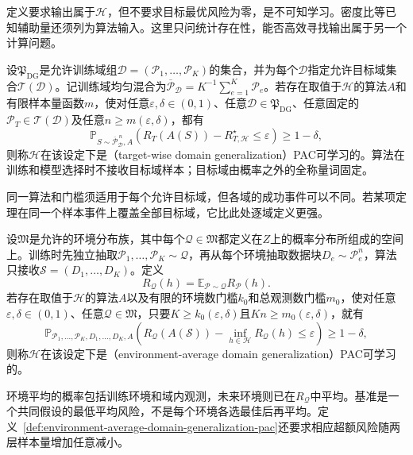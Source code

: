 定义要求输出属于$\mathcal H$，但不要求目标最优风险为零，是不可知学习。密度比等已知辅助量还须列为算法输入。这里只问统计存在性，能否高效寻找输出属于另一个计算问题。

\begin{definition}[逐目标域领域泛化PAC可学习性]
\label{def:targetwise-domain-generalization-pac}
设$\mathfrak P_{\mathrm{DG}}$是允许训练域组$\mathcal D=(\mathcal P_1,\ldots,\mathcal P_K)$的集合，并为每个$\mathcal D$指定允许目标域集合$\mathcal T(\mathcal D)$。记训练域均匀混合为$\overline{\mathcal P}_{\mathcal D}=K^{-1}\sum_{e=1}^K\mathcal P_e$。若存在取值于$\mathcal H$的算法$A$和有限样本量函数$m$，使对任意$\varepsilon,\delta\in(0,1)$、任意$\mathcal D\in\mathfrak P_{\mathrm{DG}}$、任意固定的$\mathcal P_T\in\mathcal T(\mathcal D)$及任意$n\geq m(\varepsilon,\delta)$，都有
\[
 \mathbb P_{S\sim\overline{\mathcal P}_{\mathcal D}^{\,n},A}\!\left(
 R_T(A(S))-R_{T,\mathcal H}^{\star}\leq\varepsilon
 \right)\geq1-\delta,
\]
则称$\mathcal H$在该设定下是（target-wise domain generalization）PAC可学习的。算法在训练和模型选择时不接收目标域样本；目标域由概率之外的全称量词固定。
\end{definition}

同一算法和门槛须适用于每个允许目标域，但各域的成功事件可以不同。若某项定理在同一个样本事件上覆盖全部目标域，它比此处逐域定义更强。

\begin{definition}[环境平均领域泛化PAC可学习性]
\label{def:environment-average-domain-generalization-pac}
设$\mathfrak M$是允许的环境分布族，其中每个$\mathcal Q\in\mathfrak M$都定义在$Z$上的概率分布所组成的空间上。训练时先独立抽取$\mathcal P_1,\ldots,\mathcal P_K\sim\mathcal Q$，再从每个环境抽取数据块$D_e\sim\mathcal P_e^n$，算法只接收$\mathcal S=(D_1,\ldots,D_K)$。定义
\[
 R_{\mathcal Q}(h)=\mathbb E_{\mathcal P\sim\mathcal Q}R_{\mathcal P}(h).
\]
若存在取值于$\mathcal H$的算法$A$以及有限的环境数门槛$k_0$和总观测数门槛$m_0$，使对任意$\varepsilon,\delta\in(0,1)$、任意$\mathcal Q\in\mathfrak M$，只要$K\geq k_0(\varepsilon,\delta)$且$Kn\geq m_0(\varepsilon,\delta)$，就有
\[
 \mathbb P_{\mathcal P_1,\ldots,\mathcal P_K,D_1,\ldots,D_K,A}\!\left(
 R_{\mathcal Q}(A(\mathcal S))-\inf_{h\in\mathcal H}R_{\mathcal Q}(h)
 \leq\varepsilon
 \right)\geq1-\delta,
\]
则称$\mathcal H$在该设定下是（environment-average domain generalization）PAC可学习的。
\end{definition}

环境平均的概率包括训练环境和域内观测，未来环境则已在$R_{\mathcal Q}$中平均。基准是一个共同假设的最低平均风险，不是每个环境各选最佳后再平均。定义~\ref{def:environment-average-domain-generalization-pac}还要求相应超额风险随两层样本量增加任意减小。

